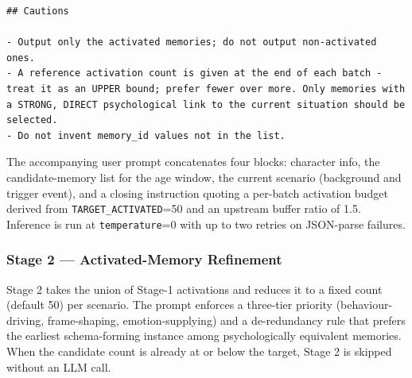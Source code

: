 \begin{tcolorbox}[
  breakable,
  colback=blue!5,
  colframe=blue!60!black,
  title={\textbf{Stage 1 — Memory Activation Screening Prompt}},
  fonttitle=\bfseries,
  rounded corners,
  boxrule=1.0pt
]
\begin{Verbatim}[fontsize=\scriptsize, breaklines=true, breaksymbolleft={}, breaksymbolright={}, breakindent=1em]
## Cautions

- Output only the activated memories; do not output non-activated ones.
- A reference activation count is given at the end of each batch - treat it as an UPPER bound; prefer fewer over more. Only memories with a STRONG, DIRECT psychological link to the current situation should be selected.
- Do not invent memory_id values not in the list.
\end{Verbatim}
\end{tcolorbox}

The accompanying user prompt concatenates four blocks: character info, the candidate-memory list for the age window, the current scenario (background and trigger event), and a closing instruction quoting a per-batch activation budget derived from \texttt{TARGET\_ACTIVATED}=50 and an upstream buffer ratio of 1.5. Inference is run at \texttt{temperature}=0 with up to two retries on JSON-parse failures.

\subsubsection{Stage 2 — Activated-Memory Refinement}
\label{app:prompt_finalize}

Stage 2 takes the union of Stage-1 activations and reduces it to a fixed count (default 50) per scenario. The prompt enforces a three-tier priority (behaviour-driving, frame-shaping, emotion-supplying) and a de-redundancy rule that prefers the earliest schema-forming instance among psychologically equivalent memories. When the candidate count is already at or below the target, Stage 2 is skipped without an LLM call.

